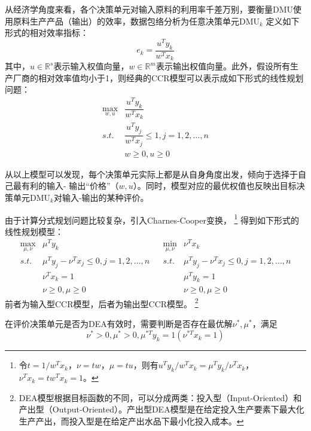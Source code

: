 从经济学角度来看，各个决策单元对输入原料的利用率千差万别，要衡量DMU使用原料生产产品（输出）的效率，数据包络分析为任意决策单元$\mathrm{DMU}_k$ 定义如下形式的相对效率指标：
\begin{equation}\label{eq:relativeefficient}
  e_k = \frac{u^T y_k}{w^T x_k}
\end{equation}
其中，$u\in \mathbb{R}^s$表示输入权值向量，$w\in \mathbb{R}^m$表示输出权值向量。此外，假设所有生产厂商的相对效率值均小于1，则经典的CCR模型可以表示成如下形式的线性规划问题：
\begin{equation}\label{eq:fracccr}
\begin{array}{ll}
  \max\limits_{w, u} & \dfrac{u^Ty_k}{w^Tx_k}\\
  \textit{s.t.} &\dfrac{u^Ty_j}{w^Tx_j}\leq 1, j=1,2,\dots,n\\
   & w\geq 0, u\geq 0
\end{array}
\end{equation}

从以上模型可以发现，每个决策单元实际上都是从自身角度出发，倾向于选择于自己最有利的输入- 输出“价格”（$w,u$）\cite{kao2005dea}。同时，模型对应的最优权值也反映出目标决策单元$\mathrm{DMU}_k$对输入-输出的某种评价。

由于计算分式规划问题比较复杂，引入Charnes-Cooper变换，
\footnote{令$t=1/w^Tx_k$，$\nu=tw$，$\mu=tu$，则有$u^Ty_k/w^Tx_k=\mu^Ty_k/\nu^Tx_k$，$\nu^Tx_k=tw^Tx_k=1$。}
得到如下形式的线性规划模型：
\begin{equation}\label{eq:ccr}
\begin{array}{lllll}
  \max\limits_{\mu,\nu} & \mu^Ty_k & & \min\limits_{\mu,\nu} & \nu^T x_k\\
  \textit{s.t.} & \mu^Ty_j -\nu^Tx_j \le 0, j=1,2,\dots,n & & \textit{s.t.} & \mu^Ty_j -\nu^Tx_j \le 0, j=1,2,\dots,n \\
   & \nu^Tx_k = 1 & & & \mu^T y_k = 1\\
   & \nu\geq 0, \mu\geq 0 & & & \nu\geq 0, \mu\geq 0
\end{array}
\end{equation}
前者为输入型CCR模型，后者为输出型CCR模型。
\footnote{DEA模型根据目标函数的不同，可以分成两类：投入型（Input-Oriented）和产出型（Output-Oriented）。产出型DEA模型是在给定投入生产要素下最大化生产产出，而投入型是在给定产出水品下最小化投入成本。}

在评价决策单元是否为DEA有效时，需要判断是否存在最优解$\nu^{*},\mu^{*}$，满足
\begin{equation}
  \nu^{*} >0, \mu^{*} >0, \mu^{*T}y_k = 1(\nu^{*T}x_k = 1)
\end{equation}


